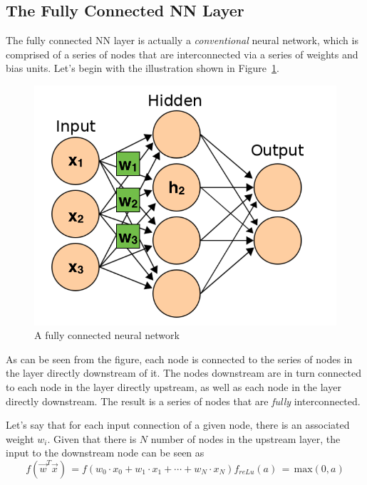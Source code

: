 \documentclass[letterpaper,12pt]{article}
\newcommand{\figref}[1]{Figure~\ref{#1}}
\begin{document}
\subsection{The Fully Connected NN Layer}

The fully connected NN layer is actually a \textit{conventional} neural network, which is comprised of a series of nodes that are interconnected via a series of weights and bias units. Let's begin with the illustration shown in \figref{ann}.

\begin{figure}[htbp]
\begin{center}
\includegraphics[scale=0.5]{images/nn_edit.png}
\caption{A fully connected neural network \cite{ann}}
\label{ann}
\end{center}
\end{figure}

As can be seen from the figure, each node is connected to the series of nodes in the layer directly downstream of it. The nodes downstream are in turn connected to each node in the layer directly upstream, as well as each node in the layer directly downstream. The result is a series of nodes that are \textit{fully} interconnected.

Let's say that for each input connection of a given node, there is an associated weight $w_i$. Given that there is $N$ number of nodes in the upstream layer, the input to the downstream node can be seen as 
\begin{equation}
f(\vec{w}^T\vec{x}) \, = f(w_0 \cdot x_0 + w_1 \cdot x_1 + \cdots + w_N \cdot x_N)
f_{reLu}(a) \, = \, \text{max}(0,a)
\end{equation}
\end{document}
